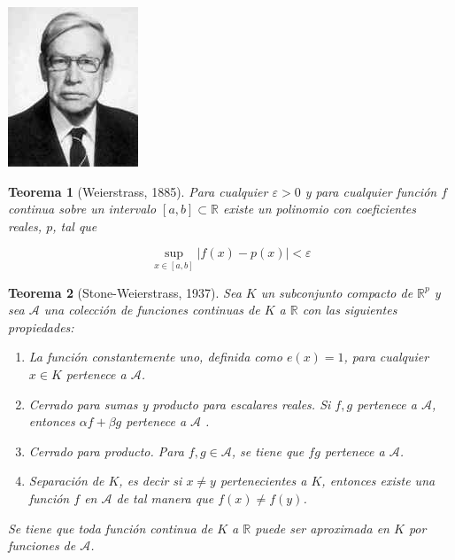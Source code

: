 \documentclass[11pt,twoside,titlepage,a4paper]{article}
\numberwithin{equation}{section} %
\theoremstyle{usual}
\newtheorem{theorem}{Teorema}[section] %
\begin{document}
\begin{marginfigure}
    \includegraphics[width=\marginparwidth]{Source/images/marshall_stone.jpg}
    \caption{Marshall Harvey Stone (1903-1989) fue un matemático estadounidense que contribuyó al análisis, a la topología y al estudio de las álgebras booleanas. \cite{stone}.Generalizó  el enunciado del teorema de Weierstrass y simplificó su demostración en 1937.}
\end{marginfigure}

\begin{theorem}[Weierstrass, 1885]
    Para cualquier $\varepsilon > 0$ y para cualquier función $f$ continua sobre un intervalo $[a,b] \subset \mathbb{R}$ existe un polinomio con coeficientes reales, $p$, tal que 

    \begin{equation}
    \sup_{x \in [a,b]} |f(x) - p(x)| < \varepsilon        
    \end{equation}
\end{theorem}

\begin{theorem}[Stone-Weierstrass, 1937]
    Sea $K$ un subconjunto compacto de $\mathbb{R}^p$ y sea $\mathcal{A}$ una colección de 
    funciones continuas de $K$ a $\mathbb{R}$ con las siguientes propiedades: 

    \begin{enumerate}
        \item La función constantemente uno, definida como $e(x)=1$, para cualquier $x\in K$ pertenece a $\mathcal{A}$.
        \item Cerrado para sumas y producto para escalares reales. Si $f,g$ pertenece a  $\mathcal{A}$, entonces $\alpha f + \beta g$ pertenece a $\mathcal{A}$ . 
        \item Cerrado para producto. Para $f,g \in \mathcal A$, se tiene que $fg$ pertenece a $\mathcal{A}$. 
        \item Separación de $K$, es decir si $x \neq y$ pertenecientes a $K$, entonces existe una función $f$ en $\mathcal{A}$  de tal manera que $f(x) \neq f(y)$. 
    \end{enumerate}
    
     Se tiene que toda función continua de $K$ a $\mathbb{R}$ puede ser aproximada en $K$ por funciones de $\mathcal A$. 
\end{theorem}
\end{document}
